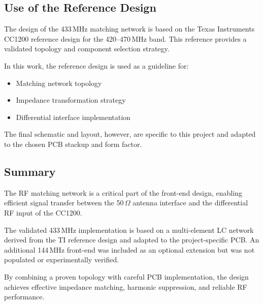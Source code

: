 \subsection{Use of the Reference Design}

The design of the 433\,MHz matching network is based on the Texas Instruments CC1200 reference design for the 420--470\,MHz band. This reference provides a validated topology and component selection strategy.

In this work, the reference design is used as a guideline for:
\begin{itemize}
    \item Matching network topology
    \item Impedance transformation strategy
    \item Differential interface implementation
\end{itemize}

The final schematic and layout, however, are specific to this project and adapted to the chosen PCB stackup and form factor.

\subsection{Summary}

The RF matching network is a critical part of the front-end design, enabling efficient signal transfer between the 50\,$\Omega$ antenna interface and the differential RF input of the CC1200.

The validated 433\,MHz implementation is based on a multi-element LC network derived from the TI reference design and adapted to the project-specific PCB. An additional 144\,MHz front-end was included as an optional extension but was not populated or experimentally verified.

By combining a proven topology with careful PCB implementation, the design achieves effective impedance matching, harmonic suppression, and reliable RF performance.